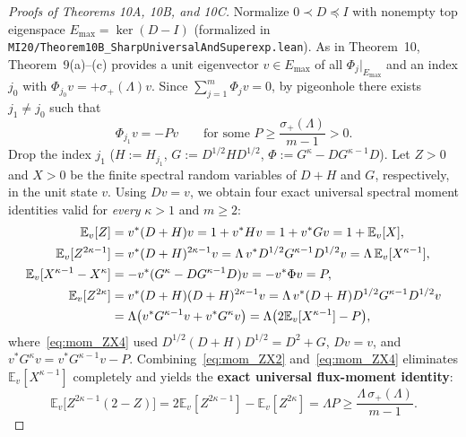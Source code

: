 \documentclass[10pt,letterpaper]{article}
\begin{document}
\begin{proof}[Proofs of Theorems 10A, 10B, and 10C]
Normalize $0 \prec D \preceq I$ with nonempty top eigenspace $E_{\max} = \ker(D - I)$ (formalized in \texttt{MI20/\allowbreak Theorem10B\_\allowbreak SharpUniversal\allowbreak AndSuperexp.lean}). As in Theorem~10, Theorem~9(a)--(c) provides a unit eigenvector $v \in E_{\max}$ of all $\Phi_j|_{E_{\max}}$ and an index $j_0$ with $\Phi_{j_0} v = +\sigma_+(\Lambda) v$. Since $\sum_{j=1}^m \Phi_j v = 0$, by pigeonhole there exists $j_1 \neq j_0$ such that
\[
  \Phi_{j_1} v = -P v \qquad \text{for some } P \ge \frac{\sigma_+(\Lambda)}{m - 1} > 0.
\]
Drop the index $j_1$ ($H := H_{j_1}$, $G := D^{1/2} H D^{1/2}$, $\Phi := G^\kappa - D G^{\kappa-1} D$). Let $Z > 0$ and $X > 0$ be the finite spectral random variables of $D + H$ and $G$, respectively, in the unit state $v$. Using $Dv = v$, we obtain four exact universal spectral moment identities valid for \emph{every} $\kappa > 1$ and $m \ge 2$:
\begin{align}
  \mathbb{E}_v[Z] &= v^*(D + H)v = 1 + v^* H v = 1 + v^* G v = 1 + \mathbb{E}_v[X], \label{eq:mom_ZX1}\\
  \mathbb{E}_v[Z^{2\kappa - 1}] &= v^*(D + H)^{2\kappa - 1}v = \Lambda\, v^* D^{1/2} G^{\kappa - 1} D^{1/2} v = \Lambda\,\mathbb{E}_v[X^{\kappa - 1}], \label{eq:mom_ZX2}\\
  \mathbb{E}_v[X^{\kappa - 1} - X^\kappa] &= -v^*(G^\kappa - D G^{\kappa - 1} D)v = -v^*\Phi v = P, \label{eq:mom_ZX3}\\
  \mathbb{E}_v[Z^{2\kappa}] &= v^*(D + H)(D + H)^{2\kappa - 1}v = \Lambda\, v^*(D + H)D^{1/2} G^{\kappa - 1} D^{1/2} v \notag\\
  &= \Lambda\bigl(v^* G^{\kappa - 1} v + v^* G^\kappa v\bigr) = \Lambda\bigl(2\mathbb{E}_v[X^{\kappa - 1}] - P\bigr), \label{eq:mom_ZX4}
\end{align}
where~\eqref{eq:mom_ZX4} used $D^{1/2}(D+H)D^{1/2} = D^2 + G$, $Dv = v$, and $v^* G^\kappa v = v^* G^{\kappa-1} v - P$. Combining~\eqref{eq:mom_ZX2} and~\eqref{eq:mom_ZX4} eliminates $\mathbb{E}_v[X^{\kappa-1}]$ completely and yields the \textbf{exact universal flux-moment identity}:
\begin{equation}\label{eq:flux_Z_id}
  \mathbb{E}_v\bigl[Z^{2\kappa - 1}(2 - Z)\bigr] = 2\mathbb{E}_v[Z^{2\kappa - 1}] - \mathbb{E}_v[Z^{2\kappa}] = \Lambda P \ge \frac{\Lambda\,\sigma_+(\Lambda)}{m - 1}.
\end{equation}


\end{proof}
\end{document}
